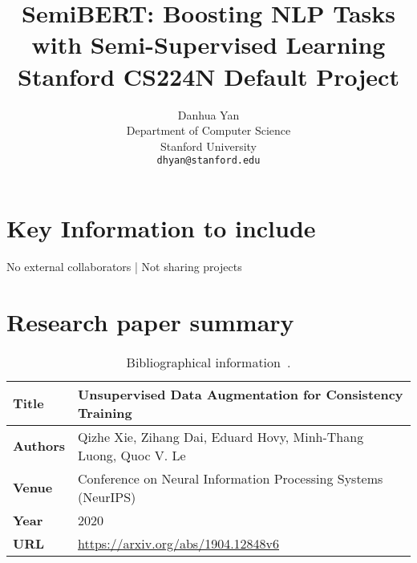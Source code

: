 \documentclass{article}
\title{
  SemiBERT: Boosting NLP Tasks with Semi-Supervised Learning \\
  \vspace{1em}
  \small{\normalfont Stanford CS224N Default Project}  %
}
\author{
  Danhua Yan \\
  Department of Computer Science \\
  Stanford University \\
  \texttt{dhyan@stanford.edu} \\
}
\newcommand{\note}[1]{\textcolor{blue}{{#1}}}
\begin{document}
\maketitle





\section{Key Information to include}

No external collaborators | Not sharing projects



\section{Research paper summary}

\begin{table}[h]
    \centering
    \begin{tabular}{ll}
        \toprule
        \textbf{Title} & Unsupervised Data Augmentation for Consistency Training \\
        \midrule
        \textbf{Authors} &  Qizhe Xie, Zihang Dai, Eduard Hovy, Minh-Thang Luong, Quoc V. Le \\
        \textbf{Venue} & Conference on Neural Information Processing Systems (NeurIPS) \\
        \textbf{Year}  & 2020 \\
        \textbf{URL}   & \url{https://arxiv.org/abs/1904.12848v6} \\
        \bottomrule
    \end{tabular}
    \vspace{1em}
    \caption{Bibliographical information~\cite{xie2020unsupervised}.}
\end{table}
\end{document}
